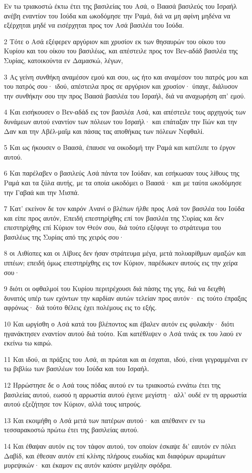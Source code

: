 \par Εν τω τριακοστώ έκτω έτει της βασιλείας του Ασά, ο Βαασά βασιλεύς του Ισραήλ ανέβη εναντίον του Ιούδα και ωκοδόμησε την Ραμά, διά να μη αφίνη μηδένα να εξέρχηται μηδέ να εισέρχηται προς τον Ασά βασιλέα του Ιούδα.
\par 2 Τότε ο Ασά εξέφερεν αργύριον και χρυσίον εκ των θησαυρών του οίκου του Κυρίου και του οίκου του βασιλέως, και απέστειλε προς τον Βεν-αδάδ βασιλέα της Συρίας, κατοικούντα εν Δαμασκώ, λέγων,
\par 3 Ας γείνη συνθήκη αναμέσον εμού και σου, ως ήτο και αναμέσον του πατρός μου και του πατρός σου· ιδού, απέστειλα προς σε αργύριον και χρυσίον· ύπαγε, διάλυσον την συνθήκην σου την προς Βαασά βασιλέα του Ισραήλ, διά να αναχωρήση απ' εμού.
\par 4 Και εισήκουσεν ο Βεν-αδάδ εις τον βασιλέα Ασά, και απέστειλε τους αρχηγούς των δυνάμεων αυτού εναντίον των πόλεων του Ισραήλ· και επάταξαν την Ιϊών και την Δαν και την Αβέλ-μαΐμ και πάσας τας αποθήκας των πόλεων Νεφθαλί.
\par 5 Και ως ήκουσεν ο Βαασά, έπαυσε να οικοδομή την Ραμά και κατέλιπε το έργον αυτού.
\par 6 Και παρέλαβεν ο βασιλεύς Ασά πάντα τον Ιούδαν, και εσήκωσαν τους λίθους της Ραμά και τα ξύλα αυτής, με τα οποία ωκοδόμει ο Βαασά· και με ταύτα ωκοδόμησε την Γαβαά και την Μισπά.
\par 7 Κατ' εκείνον δε τον καιρόν Ανανί ο βλέπων ήλθε προς Ασά τον βασιλέα του Ιούδα και είπε προς αυτόν, Επειδή επεστηρίχθης επί τον βασιλέα της Συρίας και δεν επεστηρίχθης επί Κύριον τον Θεόν σου, διά τούτο εξέφυγε το στράτευμα του βασιλέως της Συρίας από της χειρός σου·
\par 8 οι Αιθίοπες και οι Λίβυες δεν ήσαν στράτευμα μέγα, μετά πολυαρίθμων αμαξών και ιππέων; επειδή όμως επεστηρίχθης εις τον Κύριον, παρέδωκεν αυτούς εις την χείρα σου·
\par 9 διότι οι οφθαλμοί του Κυρίου περιτρέχουσι διά πάσης της γης, διά να δειχθή δυνατός υπέρ των εχόντων την καρδίαν αυτών τελείαν προς αυτόν· εις τούτο έπραξας αφρόνως· διά τούτο θέλεις έχει πολέμους εις το εξής.
\par 10 Και ωργίσθη ο Ασά κατά του βλέποντος και έβαλεν αυτόν εις φυλακήν· διότι ηγανάκτησεν εναντίον αυτού διά τούτο. Και κατέθλιψεν ο Ασά τινάς εκ του λαού εν εκείνω τω καιρώ.
\par 11 Και ιδού, αι πράξεις του Ασά, αι πρώται και αι έσχαται, ιδού, είναι γεγραμμέναι εν τω βιβλίω των βασιλέων του Ιούδα και του Ισραήλ.
\par 12 Ηρρώστησε δε ο Ασά τους πόδας αυτού εν τω τριακοστώ εννάτω έτει της βασιλείας αυτού, εωσού η αρρωστία αυτού έγεινε μεγίστη· αλλ' ουδέ εν τη αρρωστία αυτού εξεζήτησε τον Κύριον, αλλά τους ιατρούς.
\par 13 Και εκοιμήθη ο Ασά μετά των πατέρων αυτού· και απέθανεν εν τω τεσσαρακοστώ πρώτω έτει της βασιλείας αυτού.
\par 14 Και έθαψαν αυτόν εις τον τάφον αυτού, τον οποίον έσκαψε δι' εαυτόν εν πόλει Δαβίδ, και έθεσαν αυτόν επί κλίνης πλήρους ευωδίας και διαφόρων αρωμάτων μυρεψικών· και έκαμον εις αυτόν καύσιν μεγάλην σφόδρα.

